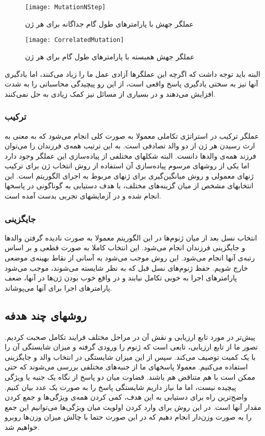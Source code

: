 \documentclass{report}
\begin{document}
\begin{figure}[!h] \centerline{\texttt{[image: MutationNStep]}} \caption{\label{fMutationNStep}
 عملگر جهش با پارامترهای طول گام جداگانه برای هر ژن
 } \end{figure}
 
\begin{figure}[!h] \centerline{\texttt{[image: CorrelatedMutation]}} \caption{\label{fCorrelatedMutation}
 عملگر جهش همبسته با پارامترهای طول گام برای هر ژن
 } \end{figure}
 
  البته باید توجه داشت که اگرچه این عملگرها آزادی عمل ما را زیاد می‌کنند، اما یادگیری آنها نیز به سختی یادگیری پاسخ واقعی است، از این رو پیچیدگی محاسباتی را به شدت افزایش می‌دهند و در بسیاری از مسائل نیز کمک زیادی به حل نمی‌کنند.

\subsubsection{ترکیب}
عملگر ترکیب در استراتژی تکاملی معمولا به صورت کلی انجام می‌شود که به معنی به ارث رسیدن هر ژن از دو والد تصادفی است. به این ترتیب همه‌ی فرزندان را می‌توان فرزند همه‌ی والدها دانست. البته شکلهای مختلفی از پیاده‌سازی این عملگر وجود دارد اما یکی از روشهای مرسوم پیاده‌سازی آن استفاده از روش انتخاب ژن برای ترکیب ژنهای معمولی و روش میانگین‌گیری برای ژنهای مربوط به اجرای الگوریتم است. این انتخابهای مشخص از میان گزینه‌های مختلف، با هدف دستیابی به گوناگونی در پاسخها انجام شده و در آزمایشهای تجربی بدست آمده است.

\subsubsection{جایگزینی}
انتخاب نسل بعد از میان ژنوم‌ها در این الگوریتم معمولا به صورت نادیده گرفتن والدها و جایگزینی فرزندان انجام می‌شود. این انتخاب کاملا به صورت قطعی و بر اساس رتبه‌ی آنها انجام می‌شود. این روش موجب می‌شود به آسانی از نقاط بهینه‌ی موضعی خارج شویم. حفظ ژنوم‌های نسل قبل که به نظر شایسته می‌شوند، موجب می‌شود پارامترهای اجرا به خوبی تکامل نیابند و در واقع خوب بودن ژن‌ها در آنها، ضعف پارامترهای اجرا برای آنها می‌پوشاند.

\subsection{روشهای چند هدفه}
پیش‌تر در مورد تابع ارزیابی و نقش آن در مراحل مختلف فرایند تکامل صحبت کردیم. تصور ما از تابع ارزیابی، تابعی است که ژنوم را ورودی گرفته و میزان شایستگی آن را با یک کمیت توصیف می‌کند. سپس از این میزان شایستگی در انتخاب والد و جایگزینی استفاده می‌کنیم. معمولا پاسخهای ما از جنبه‌های مختلفی بررسی می‌شوند که حتی ممکن است با هم متناقض هم باشند. قضاوت میان دو پاسخ از نگاه یک جنبه یا ویژگی پیچیده نیست، اما ما نیاز داریم شایستگی پاسخ را به صورت یک عدد بیان کنیم. واضح‌ترین راه برای دستیابی به این هدف، کمی کردن همه‌ی ويژگی‌ها و جمع کردن مقدار آنها است. در این روش برای وارد کردن اولویت میان ویژگی‌ها می‌توانیم این جمع را به صورت وزن‌دار انجام دهیم که در این صورت حتما با چالش میزان وزن‌ها روبرو خواهیم شد.
\end{document}
